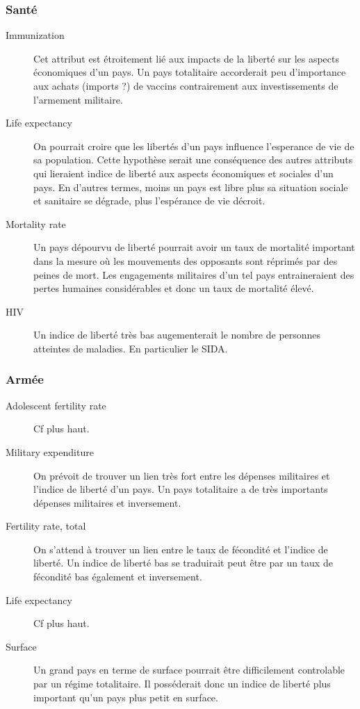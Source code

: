 \subsubsection{Santé} 
\begin{description}
\item [Immunization]
Cet attribut est étroitement lié aux impacts de la liberté sur les aspects économiques d'un pays. Un pays totalitaire
accorderait peu d'importance aux achats (imports ?) de vaccins contrairement aux investissements de l'armement militaire.
\item [Life expectancy]
On pourrait croire que les libertés d'un pays influence l'esperance de vie de sa population. Cette hypothèse serait une conséquence
des autres attributs qui lieraient indice de liberté aux aspects économiques et sociales d'un pays. En d'autres termes, moins un pays est libre plus sa situation sociale et sanitaire se dégrade, plus l'espérance de vie décroit.
\item [Mortality rate]
Un pays dépourvu de liberté pourrait avoir un taux de mortalité important dans la mesure où les mouvements des opposants sont réprimés par des peines de mort.
Les engagements militaires d'un tel pays entraineraient des pertes humaines considérables et donc un taux de mortalité élevé.
\item [HIV]
Un indice de liberté très bas augementerait le nombre de personnes atteintes de maladies. En particulier le SIDA.
\end{description}
 
\subsubsection{Armée}
\begin{description}
\item [Adolescent fertility rate]
Cf plus haut.
\item [Military expenditure]
On prévoit de trouver un lien très fort entre les dépenses militaires et l'indice de liberté d'un pays. Un pays totalitaire a de très importants dépenses militaires et inversement.
\item [Fertility rate, total]
On s'attend à trouver un lien entre le taux de fécondité et l'indice de liberté. Un indice de liberté bas se traduirait peut être par un taux de fécondité bas également et inversement.
\item [Life expectancy]
Cf plus haut.
\item [Surface]
Un grand pays en terme de surface pourrait être difficilement controlable par un régime totalitaire. Il posséderait donc un indice de liberté plus important qu'un pays plus petit en surface.
\end{description}
 
